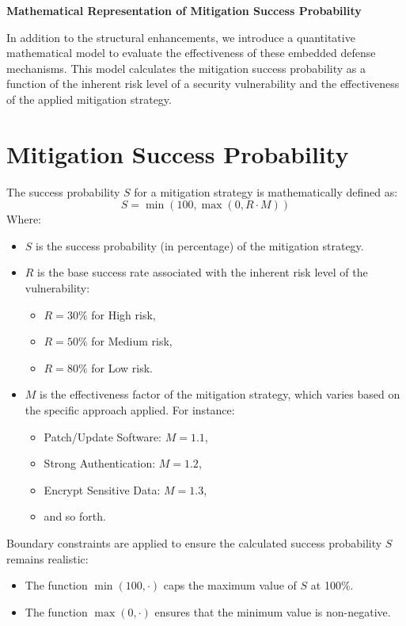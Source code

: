 \documentclass[conference]{IEEEtran}
\begin{document}
\textbf{Mathematical Representation of Mitigation Success Probability}

In addition to the structural enhancements, we introduce a quantitative mathematical model to evaluate the effectiveness of these embedded defense mechanisms. This model calculates the mitigation success probability as a function of the inherent risk level of a security vulnerability and the effectiveness of the applied mitigation strategy.

\section*{Mitigation Success Probability}
The success probability \( S \) for a mitigation strategy is mathematically defined as:
\[
S = \min(100, \max(0, R \cdot M))
\]
Where:
\begin{itemize}
    \item \( S \) is the success probability (in percentage) of the mitigation strategy.
    \item \( R \) is the base success rate associated with the inherent risk level of the vulnerability:
    \begin{itemize}
        \item \( R = 30\% \) for High risk,
        \item \( R = 50\% \) for Medium risk,
        \item \( R = 80\% \) for Low risk.
    \end{itemize}
    \item \( M \) is the effectiveness factor of the mitigation strategy, which varies based on the specific approach applied. For instance:
    \begin{itemize}
        \item Patch/Update Software: \( M = 1.1 \),
        \item Strong Authentication: \( M = 1.2 \),
        \item Encrypt Sensitive Data: \( M = 1.3 \),
        \item and so forth.
    \end{itemize}
\end{itemize}

Boundary constraints are applied to ensure the calculated success probability \( S \) remains realistic:
\begin{itemize}
    \item The function \( \min(100, \cdot) \) caps the maximum value of \( S \) at 100\%.
    \item The function \( \max(0, \cdot) \) ensures that the minimum value is non-negative.
\end{itemize}
\end{document}
